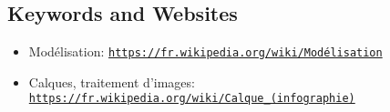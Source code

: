 \documentclass[a4paper,11pt]{report}
\newcommand{\BrochureUrlText}[1]{\texttt{#1}}
\begin{document}
{\raggedright

\subsection*{Keywords and Websites}

\begin{itemize}
  \item Modélisation: \href{https://fr.wikipedia.org/wiki/Mod\%C3\%A9lisation}{\BrochureUrlText{https://fr.wikipedia.org/wiki/Modélisation}}
  \item Calques, traitement d’images: \href{https://fr.wikipedia.org/wiki/Calque_(infographie)}{\BrochureUrlText{https://fr.wikipedia.org/wiki/Calque\_(infographie)}}
\end{itemize}


}
\end{document}
